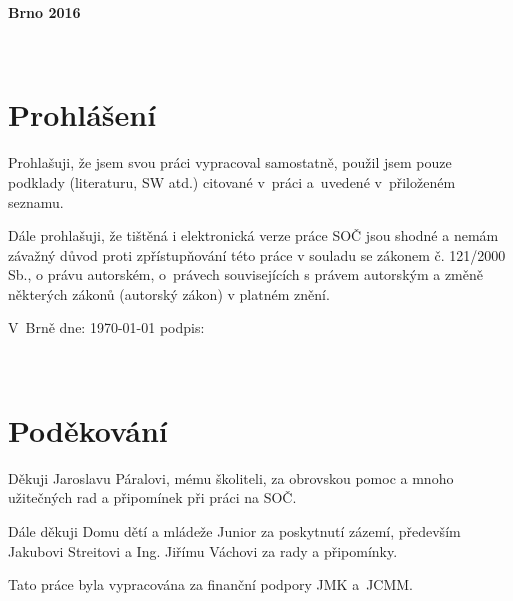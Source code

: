 \documentclass[12pt, a4paper, oneside]{article}
\begin{document}
\vspace{20mm}

\begin{center}
\textbf{Brno 2016}

\end{center}
\normalsize
\newpage  %

~ %

\vspace{10mm}

\section*{Prohlášení}


Prohlašuji, že jsem svou práci vypracoval samostatně, použil jsem pouze
podklady (literaturu, SW atd.) citované v~práci a~uvedené v~přiloženém seznamu.

Dále prohlašuji, že tištěná i elektronická verze práce SOČ jsou shodné a nemám závažný důvod proti zpřístupňování této práce v souladu se zákonem č. 121/2000 Sb., o právu autorském, o právech souvisejících s právem autorským a změně některých zákonů (autorský zákon) v platném znění.

\vspace{20mm}

 V~Brně  dne: \today{}    \hspace{50mm}                 podpis:


\newpage   %

~ %

\vspace{90mm}

\section*{Poděkování}

Děkuji Jaroslavu Páralovi, mému školiteli, za obrovskou pomoc a mnoho užitečných rad a připomínek při práci na SOČ.

Dále děkuji Domu dětí a mládeže Junior za poskytnutí zázemí, především Jakubovi Streitovi a Ing. Jiřímu Váchovi za rady a připomínky.

 Tato práce byla vypracována za finanční podpory JMK a~JCMM.
\end{document}
